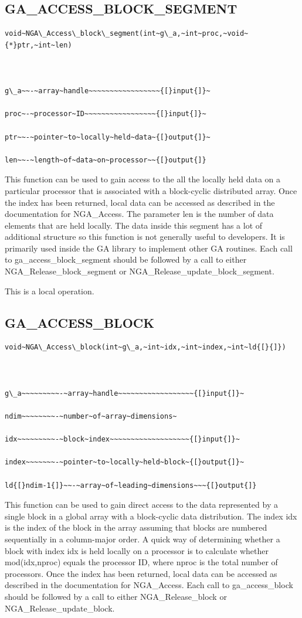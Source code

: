\subsection*{\label{sub:GA_ACCESS_BLOCK_SEGMENT}GA\_ACCESS\_BLOCK\_SEGMENT}
\begin{verbatim}
void~NGA\_Access\_block\_segment(int~g\_a,~int~proc,~void~{*}ptr,~int~len)



g\_a~~-~array~handle~~~~~~~~~~~~~~~~~{[}input{]}~

proc~-~processor~ID~~~~~~~~~~~~~~~~~{[}input{]}~

ptr~~-~pointer~to~locally~held~data~{[}output{]}~

len~~-~length~of~data~on~processor~~{[}output{]}
\end{verbatim}
This function can be used to gain access to the all the locally held
data on a particular processor that is associated with a block-cyclic
distributed array. Once the index has been returned, local data can
be accessed as described in the documentation for NGA\_Access. The
parameter len is the number of data elements that are held locally.
The data inside this segment has a lot of additional structure so
this function is not generally useful to developers. It is primarily
used inside the GA library to implement other GA routines. Each call
to ga\_access\_block\_segment should be followed by a call to either
NGA\_Release\_block\_segment or NGA\_Release\_update\_block\_segment.

This is a local operation. 


\subsection*{\label{sub:GA_ACCESS_BLOCK}GA\_ACCESS\_BLOCK}
\begin{verbatim}
void~NGA\_Access\_block(int~g\_a,~int~idx,~int~index,~int~ld{[}{]})



g\_a~~~~~~~~~-~array~handle~~~~~~~~~~~~~~~~~~{[}input{]}~

ndim~~~~~~~~-~number~of~array~dimensions~

idx~~~~~~~~~-~block~index~~~~~~~~~~~~~~~~~~~{[}input{]}~

index~~~~~~~-~pointer~to~locally~held~block~{[}output{]}~

ld{[}ndim-1{]}~~-~array~of~leading~dimensions~~~{[}output{]}
\end{verbatim}
This function can be used to gain direct access to the data represented
by a single block in a global array with a block-cyclic data distribution.
The index idx is the index of the block in the array assuming that
blocks are numbered sequentially in a column-major order. A quick
way of determining whether a block with index idx is held locally
on a processor is to calculate whether mod(idx,nproc) equals the processor
ID, where nproc is the total number of processors. Once the index
has been returned, local data can be accessed as described in the
documentation for NGA\_Access. Each call to ga\_access\_block should
be followed by a call to either NGA\_Release\_block or NGA\_Release\_update\_block.

